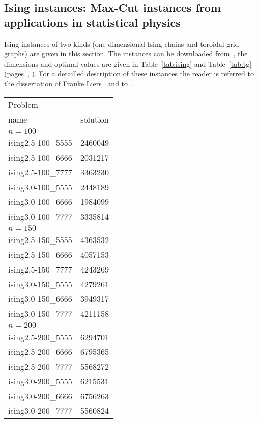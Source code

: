\documentclass[a4paper, 12pt]{article}
\begin{document}
\subsection{Ising instances: Max-Cut instances from applications in
  statistical physics} 
\label{sec:phys}
Ising instances of two kinds (one-dimensional Ising chains and
toroidal grid graphs) are given in this section. The instances can be
downloaded from~\cite{Wi:07}, the dimensions and optimal values are
given in Table~\ref{tab:ising} and Table~\ref{tab:tg}
(pages~\pageref{tab:ising}, \pageref{tab:tg}).
For a detailled description of these instances the reader is referred 
to the dissertation of Frauke Liers~\cite{Li:04} and
to~\cite{LiJuReRi:05}.   

\begin{table} \begin{center}
\begin{tabular}{|l|r|}
\hline
Problem & \\
name &\multicolumn{1}{|c|}{solution}\\
\hline
\multicolumn{2}{|l|}{$n=100$}\\
\hline
ising2.5-100\_5555 & 2460049 \\
ising2.5-100\_6666 & 2031217 \\
ising2.5-100\_7777 & 3363230 \\
ising3.0-100\_5555 & 2448189 \\
ising3.0-100\_6666 & 1984099 \\
ising3.0-100\_7777 & 3335814 \\
\hline
\multicolumn{2}{|l|}{$n=150$}\\
\hline
ising2.5-150\_5555 & 4363532 \\
ising2.5-150\_6666 & 4057153 \\
ising2.5-150\_7777 & 4243269 \\
ising3.0-150\_5555 & 4279261 \\
ising3.0-150\_6666 & 3949317 \\
ising3.0-150\_7777 & 4211158 \\
\hline
\multicolumn{2}{|l|}{$n=200$}\\
\hline
ising2.5-200\_5555 & 6294701 \\
ising2.5-200\_6666 & 6795365 \\
ising2.5-200\_7777 & 5568272 \\
ising3.0-200\_5555 & 6215531 \\
ising3.0-200\_6666 & 6756263 \\
ising3.0-200\_7777 & 5560824 \\

\end{tabular}
\end{center}
\end{table}
\end{document}
